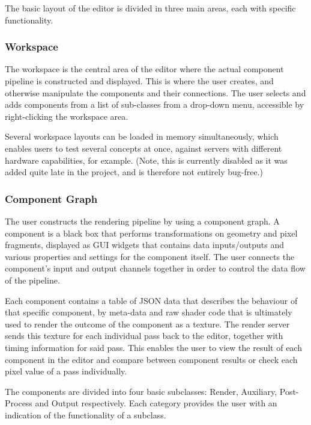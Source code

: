 The basic layout of the editor is divided in three main areas, each with specific functionality.  

\subsubsection{Workspace}
The workspace is the central area of the editor where the actual component pipeline is constructed and displayed. This is where the user creates, and otherwise manipulate the components and their connections. The user selects and adds components from a list of sub-classes from a drop-down menu, accessible by right-clicking the workspace area. 

Several workspace layouts can be loaded in memory simultaneously, which enables users to test several concepts at once, against servers with different hardware capabilities, for example. (Note, this is currently disabled as it was added quite late in the project, and is therefore not entirely bug-free.)

\subsubsection{Component Graph}
The user constructs the rendering pipeline by using a component graph. A component is a black box that performs transformations on geometry and pixel fragments, displayed as GUI widgets that contains data inputs/outputs and various properties and settings for the component itself. The user connects the component’s input and output channels together in order to control the data flow of the pipeline. 

Each component contains a table of JSON data that describes the behaviour of that specific component, by meta-data and raw shader code that is ultimately used to render the outcome of the component as a texture. The render server sends this texture for each individual pass back to the editor, together with timing information for said pass. This enables the user to view the result of each component in the editor and compare between component results or check each pixel value of a pass individually. 

The components are divided into four basic subclasses: Render, Auxiliary, Post-Process and Output respectively. Each category provides the user with an indication of the functionality of a subclass. 

